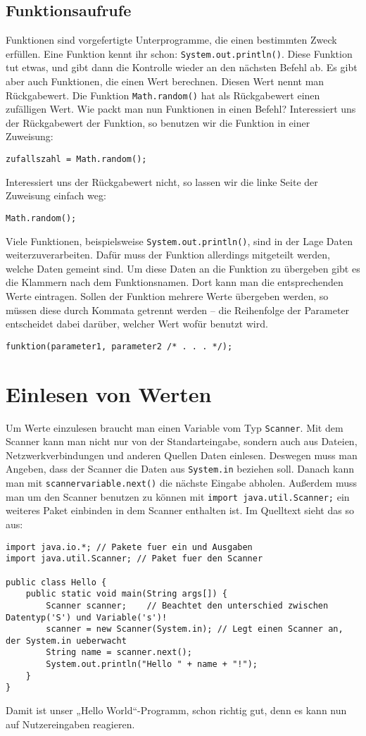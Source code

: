\subsection{Funktionsaufrufe}
Funktionen sind vorgefertigte Unterprogramme, die einen bestimmten Zweck erfüllen. Eine Funktion kennt ihr schon: \lstinline$System.out.println()$.
Diese Funktion tut etwas, und gibt dann die Kontrolle wieder an den nächsten Befehl ab. Es gibt aber auch Funktionen, die einen Wert berechnen.
Diesen Wert nennt man Rückgabewert. Die Funktion \lstinline$Math.random()$ hat als Rückgabewert einen zufälligen Wert.
Wie packt man nun Funktionen in einen Befehl? Interessiert uns der Rückgabewert der Funktion, so benutzen wir die Funktion in einer Zuweisung: 
\begin{lstlisting}
zufallszahl = Math.random();
\end{lstlisting}
Interessiert uns der Rückgabewert nicht, so lassen wir die linke Seite der Zuweisung einfach weg:
\begin{lstlisting}
Math.random();
\end{lstlisting}
Viele Funktionen, beispielsweise \lstinline$System.out.println()$, sind in der Lage Daten weiterzuverarbeiten. Dafür muss der Funktion allerdings mitgeteilt werden, welche Daten gemeint sind.
Um diese Daten an die Funktion zu übergeben gibt es die Klammern nach dem Funktionsnamen. Dort kann man die entsprechenden Werte eintragen.
Sollen der Funktion mehrere Werte übergeben werden, so müssen diese durch Kommata getrennt werden – die Reihenfolge der Parameter entscheidet dabei darüber, welcher Wert wofür benutzt wird.
\begin{lstlisting}
funktion(parameter1, parameter2 /* . . . */);
\end{lstlisting}

\section {Einlesen von Werten}
Um Werte einzulesen braucht man einen Variable vom Typ \lstinline$Scanner$. Mit dem Scanner kann man nicht nur von der Standarteingabe, sondern auch aus Dateien, Netzwerkverbindungen und anderen Quellen Daten einlesen. 
Deswegen muss man Angeben, dass der Scanner die Daten aus \lstinline$System.in$ beziehen soll.
Danach kann man mit \lstinline$scannervariable.next()$ die nächste Eingabe abholen.
Außerdem muss man um den Scanner benutzen zu können mit \lstinline$import java.util.Scanner;$ ein weiteres Paket einbinden in dem Scanner enthalten ist.
Im Quelltext sieht das so aus:
\begin{lstlisting}
import java.io.*; // Pakete fuer ein und Ausgaben
import java.util.Scanner; // Paket fuer den Scanner

public class Hello {
	public static void main(String args[]) {
		Scanner scanner;	// Beachtet den unterschied zwischen Datentyp('S') und Variable('s')!
		scanner = new Scanner(System.in); // Legt einen Scanner an, der System.in ueberwacht
		String name = scanner.next();
		System.out.println("Hello " + name + "!");
	}
}
\end{lstlisting}
Damit ist unser „Hello World“-Programm, schon richtig gut, denn es kann nun auf Nutzereingaben reagieren.

